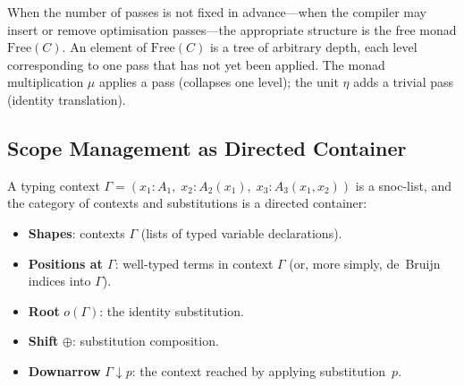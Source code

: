 \documentclass[11pt,a4paper]{article}
\theoremstyle{definition}
\theoremstyle{plain}
\newcommand{\Free}{\mathrm{Free}}
\begin{document}
When the number of passes is not fixed in advance---when the compiler
may insert or remove optimisation passes---the appropriate structure is
the free monad $\Free(C)$. An element of $\Free(C)$ is a tree of
arbitrary depth, each level corresponding to one pass that has not yet
been applied. The monad multiplication $\mu$ applies a pass (collapses
one level); the unit $\eta$ adds a trivial pass (identity translation).

\begin{center}
\end{center}

\subsection{Scope Management as Directed Container}

A typing context $\Gamma = (x_1 : A_1,\; x_2 : A_2(x_1),\;
x_3 : A_3(x_1, x_2))$ is a snoc-list, and the category of contexts and
substitutions is a directed container:
\begin{itemize}[nosep]
\item \textbf{Shapes}: contexts $\Gamma$ (lists of typed variable declarations).
\item \textbf{Positions at $\Gamma$}: well-typed terms in context $\Gamma$
  (or, more simply, de~Bruijn indices into $\Gamma$).
\item \textbf{Root} $o(\Gamma)$: the identity substitution.
\item \textbf{Shift} $\oplus$: substitution composition.
\item \textbf{Downarrow} $\Gamma \downarrow p$: the context reached by
  applying substitution~$p$.
\end{itemize}
\end{document}
